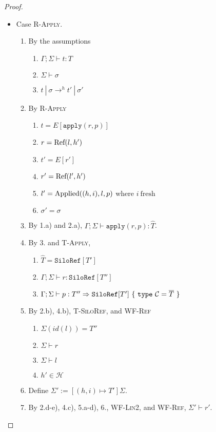 \begin{proof}
\begin{itemize}
\item Case \textsc{R-Apply}.
\begin{enumerate}
\item By the assumptions
  \begin{enumerate}[label=(\alph*)]
  \item $\Gamma ; \Sigma \vdash t : T$
  \item $\Sigma \vdash \sigma$
  \item $t~|~\sigma \rightarrow^h t'~|~\sigma'$
  \end{enumerate}
\item By \textsc{R-Apply}
  \begin{enumerate}[label=(\alph*)]
  \item $t  = E[\texttt{apply}(r, p)]$
  \item $r  = {\textrm{Ref}(l, h')}$
  \item $t' = E[r']$
  \item $r' = {\textrm{Ref}(l', h')}$
  \item $l' = {\textrm{Applied}((h, i), l, p)}$ where $i~\text{fresh}$
  \item $\sigma' = \sigma$
  \end{enumerate}
\item By 1.a) and 2.a), $\Gamma ; \Sigma \vdash \texttt{apply}(r, p) : \hat{T}$.
\item By 3. and \textsc{T-Apply},
  \begin{enumerate}[label=(\alph*)]
  \item $\hat{T} = \texttt{SiloRef}[T']$
  \item $\Gamma ; \Sigma \vdash r : \texttt{SiloRef}[T'']$
  \item $\Gamma ; \Sigma \vdash p : T'' \Rightarrow \texttt{SiloRef}[T']~\{~\texttt{type}~\mathcal{C} = \overline{T}~\}$
  \end{enumerate}
\item By 2.b), 4.b), \textsc{T-SiloRef}, and \textsc{WF-Ref}
  \begin{enumerate}[label=(\alph*)]
  \item $\Sigma(id(l)) = T''$
  \item $\Sigma \vdash r$
  \item $\Sigma \vdash l$
  \item $h' \in \mathcal{H}$
  \end{enumerate}
\item Define $\Sigma' := [(h, i) \mapsto T']\Sigma$.
\item By 2.d-e), 4.c), 5.a-d), 6., \textsc{WF-Lin2}, and \textsc{WF-Ref}, $\Sigma' \vdash r'$.

\end{enumerate}
\end{itemize}
\end{proof}
